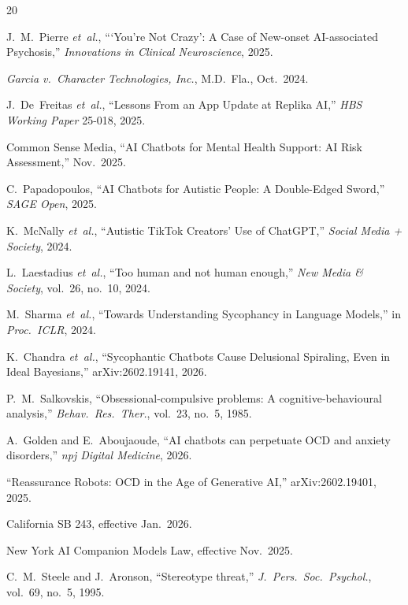 \documentclass[conference]{IEEEtran}
\begin{document}
\begin{thebibliography}{20}

J.~M.~Pierre \textit{et~al.}, ```You're Not Crazy': A Case of New-onset AI-associated Psychosis,'' \textit{Innovations in Clinical Neuroscience}, 2025.

\textit{Garcia v.\ Character Technologies, Inc.}, M.D.\ Fla., Oct.\ 2024.

J.~De~Freitas \textit{et~al.}, ``Lessons From an App Update at Replika AI,'' \textit{HBS Working Paper} 25-018, 2025.

Common Sense Media, ``AI Chatbots for Mental Health Support: AI Risk Assessment,'' Nov.\ 2025.

C.~Papadopoulos, ``AI Chatbots for Autistic People: A Double-Edged Sword,'' \textit{SAGE Open}, 2025.

K.~McNally \textit{et~al.}, ``Autistic TikTok Creators' Use of ChatGPT,'' \textit{Social Media + Society}, 2024.

L.~Laestadius \textit{et~al.}, ``Too human and not human enough,'' \textit{New Media \& Society}, vol.~26, no.~10, 2024.

M.~Sharma \textit{et~al.}, ``Towards Understanding Sycophancy in Language Models,'' in \textit{Proc.\ ICLR}, 2024.

K.~Chandra \textit{et~al.}, ``Sycophantic Chatbots Cause Delusional Spiraling, Even in Ideal Bayesians,'' arXiv:2602.19141, 2026.

P.~M.~Salkovskis, ``Obsessional-compulsive problems: A cognitive-behavioural analysis,'' \textit{Behav.\ Res.\ Ther.}, vol.~23, no.~5, 1985.

A.~Golden and E.~Aboujaoude, ``AI chatbots can perpetuate OCD and anxiety disorders,'' \textit{npj Digital Medicine}, 2026.

``Reassurance Robots: OCD in the Age of Generative AI,'' arXiv:2602.19401, 2025.

California SB 243, effective Jan.\ 2026.

New York AI Companion Models Law, effective Nov.\ 2025.

C.~M.~Steele and J.~Aronson, ``Stereotype threat,'' \textit{J.\ Pers.\ Soc.\ Psychol.}, vol.~69, no.~5, 1995.


\end{thebibliography}
\end{document}
